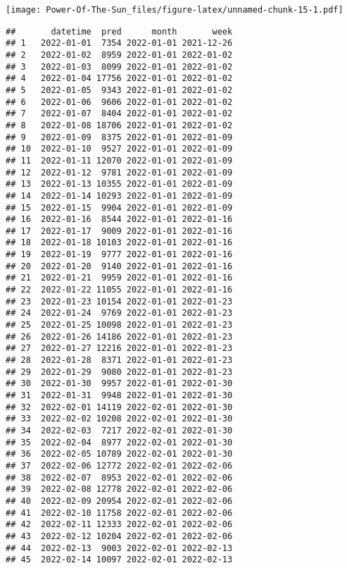 \documentclass[
]{article}
\newenvironment{Shaded}{\begin{snugshade}}{\end{snugshade}}
\newcommand{\NormalTok}[1]{#1}
\newcommand{\SpecialCharTok}[1]{\textcolor[rgb]{0.81,0.36,0.00}{\textbf{#1}}}
\begin{document}
\texttt{[image: Power-Of-The-Sun\_files/figure-latex/unnamed-chunk-15-1.pdf]}

\begin{Shaded}
\end{Shaded}

\begin{verbatim}
##       datetime  pred      month       week
## 1   2022-01-01  7354 2022-01-01 2021-12-26
## 2   2022-01-02  8959 2022-01-01 2022-01-02
## 3   2022-01-03  8099 2022-01-01 2022-01-02
## 4   2022-01-04 17756 2022-01-01 2022-01-02
## 5   2022-01-05  9343 2022-01-01 2022-01-02
## 6   2022-01-06  9606 2022-01-01 2022-01-02
## 7   2022-01-07  8404 2022-01-01 2022-01-02
## 8   2022-01-08 18706 2022-01-01 2022-01-02
## 9   2022-01-09  8375 2022-01-01 2022-01-09
## 10  2022-01-10  9527 2022-01-01 2022-01-09
## 11  2022-01-11 12070 2022-01-01 2022-01-09
## 12  2022-01-12  9781 2022-01-01 2022-01-09
## 13  2022-01-13 10355 2022-01-01 2022-01-09
## 14  2022-01-14 10293 2022-01-01 2022-01-09
## 15  2022-01-15  9904 2022-01-01 2022-01-09
## 16  2022-01-16  8544 2022-01-01 2022-01-16
## 17  2022-01-17  9009 2022-01-01 2022-01-16
## 18  2022-01-18 10103 2022-01-01 2022-01-16
## 19  2022-01-19  9777 2022-01-01 2022-01-16
## 20  2022-01-20  9140 2022-01-01 2022-01-16
## 21  2022-01-21  9959 2022-01-01 2022-01-16
## 22  2022-01-22 11055 2022-01-01 2022-01-16
## 23  2022-01-23 10154 2022-01-01 2022-01-23
## 24  2022-01-24  9769 2022-01-01 2022-01-23
## 25  2022-01-25 10098 2022-01-01 2022-01-23
## 26  2022-01-26 14186 2022-01-01 2022-01-23
## 27  2022-01-27 12216 2022-01-01 2022-01-23
## 28  2022-01-28  8371 2022-01-01 2022-01-23
## 29  2022-01-29  9080 2022-01-01 2022-01-23
## 30  2022-01-30  9957 2022-01-01 2022-01-30
## 31  2022-01-31  9948 2022-01-01 2022-01-30
## 32  2022-02-01 14119 2022-02-01 2022-01-30
## 33  2022-02-02 10208 2022-02-01 2022-01-30
## 34  2022-02-03  7217 2022-02-01 2022-01-30
## 35  2022-02-04  8977 2022-02-01 2022-01-30
## 36  2022-02-05 10789 2022-02-01 2022-01-30
## 37  2022-02-06 12772 2022-02-01 2022-02-06
## 38  2022-02-07  8953 2022-02-01 2022-02-06
## 39  2022-02-08 12778 2022-02-01 2022-02-06
## 40  2022-02-09 20954 2022-02-01 2022-02-06
## 41  2022-02-10 11758 2022-02-01 2022-02-06
## 42  2022-02-11 12333 2022-02-01 2022-02-06
## 43  2022-02-12 10204 2022-02-01 2022-02-06
## 44  2022-02-13  9003 2022-02-01 2022-02-13
## 45  2022-02-14 10097 2022-02-01 2022-02-13

\end{verbatim}
\end{document}
